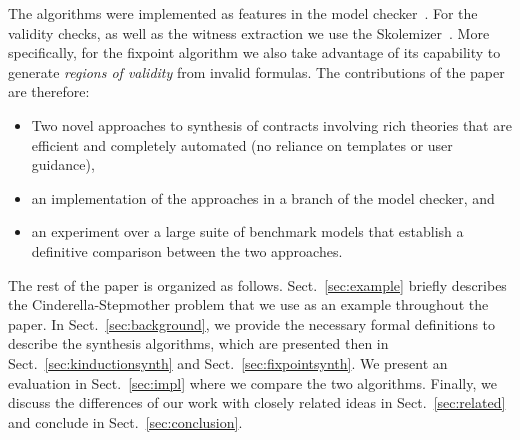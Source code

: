 The algorithms were implemented as features in the \jkind model checker~\cite{gacek2018jk}. For the validity checks, as well as the witness extraction we use the \aeval Skolemizer~\cite{fedyukovich2015automated}. More specifically, for the fixpoint algorithm we also take advantage of its capability to generate \textit{regions of validity} from invalid formulas.
The contributions of the paper are therefore:
\begin{itemize}
    \item Two novel approaches to synthesis of contracts involving rich theories that are efficient and completely automated (no reliance on templates or user guidance),
    \item an implementation of the approaches in a branch of the \jkind model checker, and
    \item an experiment over a large suite of benchmark models that establish a definitive comparison between the two approaches.
\end{itemize}

The rest of the paper is organized as follows. Sect.~\ref{sec:example} briefly describes the Cinderella-Stepmother problem that we use as an example throughout the paper. In Sect.~\ref{sec:background}, we provide the necessary formal definitions to describe the synthesis algorithms, which are presented then in Sect.~\ref{sec:kinductionsynth} and Sect.~\ref{sec:fixpointsynth}. We present an evaluation in Sect.~\ref{sec:impl} where we compare the two algorithms. Finally, we discuss the differences of our work with closely related ideas in Sect.~\ref{sec:related} and conclude in Sect.~\ref{sec:conclusion}.